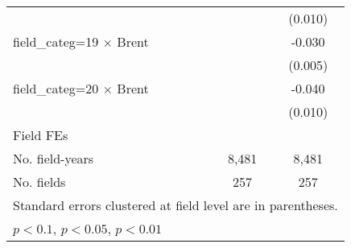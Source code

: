 {\begin{tabular}{l*{2}{c}}
                                        &                     &     (0.010)         \\
field\_categ=19 $\times$ Brent           &                     &      -0.030\sym{***}\\
                                        &                     &     (0.005)         \\
field\_categ=20 $\times$ Brent           &                     &      -0.040\sym{***}\\
                                        &                     &     (0.010)         \\
\hline
Field FEs                               &                     &                     \\
No. field-years                         &       8,481         &       8,481         \\
No. fields                              &         257         &         257         \\
\hline\hline
\multicolumn{3}{l}{\footnotesize Standard errors clustered at field level are in parentheses.}\\
\multicolumn{3}{l}{\footnotesize \sym{*} \(p<0.1\), \sym{**} \(p<0.05\), \sym{***} \(p<0.01\)}\\
\end{tabular}
}
